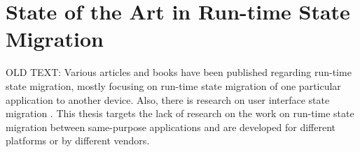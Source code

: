 \chapter{State of the Art in Run-time State Migration}
\label{ch:state_of_art}

OLD TEXT: Various articles and books have been published regarding run-time state migration, mostly focusing on run-time state migration of one particular application to another device. Also, there is research on user interface state migration  \cite{migratory-interactive}. This thesis targets the lack of research on the work on run-time state migration between same-purpose applications and are developed for different platforms or by different vendors. 